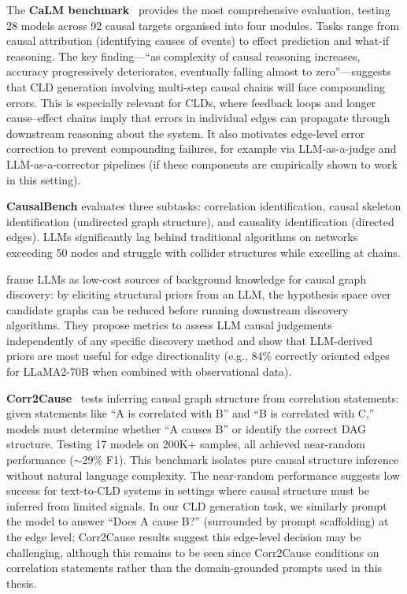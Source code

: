 The \textbf{CaLM benchmark}~\citep{chen2024calm} provides the most comprehensive evaluation, testing 28 models across 92 causal targets organised into four modules. Tasks range from causal attribution (identifying causes of events) to effect prediction and what-if reasoning. The key finding---``as complexity of causal reasoning increases, accuracy progressively deteriorates, eventually falling almost to zero''---suggests that CLD generation involving multi-step causal chains will face compounding errors. This is especially relevant for CLDs, where feedback loops and longer cause--effect chains imply that errors in individual edges can propagate through downstream reasoning about the system. It also motivates edge-level error correction to prevent compounding failures, for example via LLM-as-a-judge and LLM-as-a-corrector pipelines (if these components are empirically shown to work in this setting).

\textbf{CausalBench} evaluates three subtasks: correlation identification, causal skeleton identification (undirected graph structure), and causality identification (directed edges). LLMs significantly lag behind traditional algorithms on networks exceeding 50 nodes and struggle with collider structures while excelling at chains.

\citet{darvariu2024largelanguagemodelseffective} frame LLMs as low-cost sources of background knowledge for causal graph discovery: by eliciting structural priors from an LLM, the hypothesis space over candidate graphs can be reduced before running downstream discovery algorithms. They propose metrics to assess LLM causal judgements independently of any specific discovery method and show that LLM-derived priors are most useful for edge directionality (e.g., 84\% correctly oriented edges for LLaMA2-70B when combined with observational data).

\textbf{Corr2Cause}~\citep{jin2024largelanguagemodelsinfer} tests inferring causal graph structure from correlation statements: given statements like ``A is correlated with B'' and ``B is correlated with C,'' models must determine whether ``A causes B'' or identify the correct DAG structure. Testing 17 models on 200K+ samples, all achieved near-random performance ($\sim$29\% F1). This benchmark isolates pure causal structure inference without natural language complexity. The near-random performance suggests low success for text-to-CLD systems in settings where causal structure must be inferred from limited signals. In our CLD generation task, we similarly prompt the model to answer ``Does A cause B?'' (surrounded by prompt scaffolding) at the edge level; Corr2Cause results suggest this edge-level decision may be challenging, although this remains to be seen since Corr2Cause conditions on correlation statements rather than the domain-grounded prompts used in this thesis.

